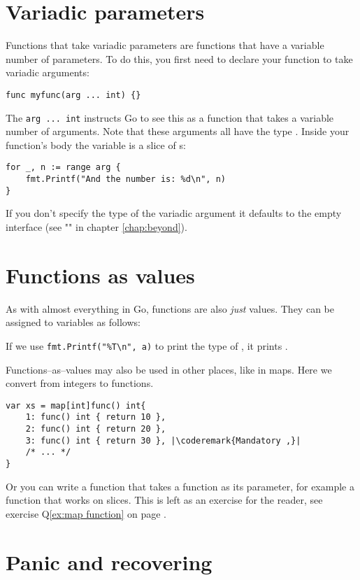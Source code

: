 \section{Variadic parameters}
Functions that take variadic parameters are functions that have a
variable number of parameters. To do this, you first
need to declare your function to take variadic arguments:
\begin{lstlisting}[caption=Variadac parameters]
func myfunc(arg ... int) {}
\end{lstlisting}
The \lstinline{arg ... int} instructs Go to see this as a function that
takes a variable number of arguments. Note that these arguments all
have the type . Inside your function's body the variable
 is a slice of s:
\begin{lstlisting}
for _, n := range arg {
    fmt.Printf("And the number is: %d\n", n)
}
\end{lstlisting}

If you don't specify the type of the variadic argument it defaults to the
empty interface  (see "" in
chapter \ref{chap:beyond}).

\section{Functions as values}
\label{sec:functions as values}
As with almost everything in Go, functions are also \emph{just} values.
They can be assigned to variables as follows:

If we use \lstinline{fmt.Printf("%T\n", a)} to print the type of
, it prints .

Functions--as--values may also be used in other places, like in maps.
Here we convert from integers to functions.
\begin{lstlisting}[caption=Function as values in maps]
var xs = map[int]func() int{
    1: func() int { return 10 },
    2: func() int { return 20 },
    3: func() int { return 30 }, |\coderemark{Mandatory ,}|
    /* ... */
}
\end{lstlisting}
Or you can write a function that takes a function as its parameter, for
example a  function that works on  slices. This is
left as an exercise for the reader, see exercise Q\ref{ex:map function}
on page \pageref{ex:map function}.

\section{Panic and recovering}
\label{sec:panic}
\todo{}

